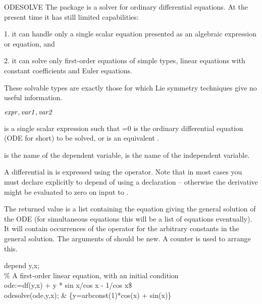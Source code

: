 \begin{Operator}[odesolve]{ODESOLVE}
The  package is a solver for ordinary differential
equations.  At the present time it has still limited capabilities:

  1. it  can handle  only a single  scalar equation  presented as  an
     algebraic expression or equation, and

  2. it can solve only first-order equations of simple  types, linear
     equations with constant coefficients and Euler equations.

These  solvable  types  are exactly  those  for  which  Lie  symmetry
techniques give no useful information.

\begin{Syntax}

\(\meta{expr},\meta{var1},\meta{var2}\)

\end{Syntax}

 is  a single  scalar expression  such  that =0  
is the ordinary differential equation (ODE for short) to be  solved, or
is an equivalent .

 is the name of the dependent variable,
 is the name of the independent variable.

A differential in  is expressed using the 
operator. Note that in most cases you must declare explicitly
 to depend of  using a 
declaration -- otherwise the derivative might be evaluated to
zero on input to .

The returned value is a  list containing the equation giving the  general
solution  of the  ODE  (for simultaneous  equations  this will  be  a
list  of equations  eventually).    It  will contain  occurrences  of
the  operator  for the  arbitrary constants  in the  general
solution.   The arguments of  should  be new.
A counter    is used  to  arrange  this.

\begin{Examples}
depend y,x;\\
\% A first-order linear equation, with an initial condition\\
ode:=df(y,x) + y * sin x/cos x - 1/cos x\$\\
odesolve(ode,y,x); &  \{y=arbconst(1)*cos(x) + sin(x)\}
\end{Examples}      

\end{Operator}


